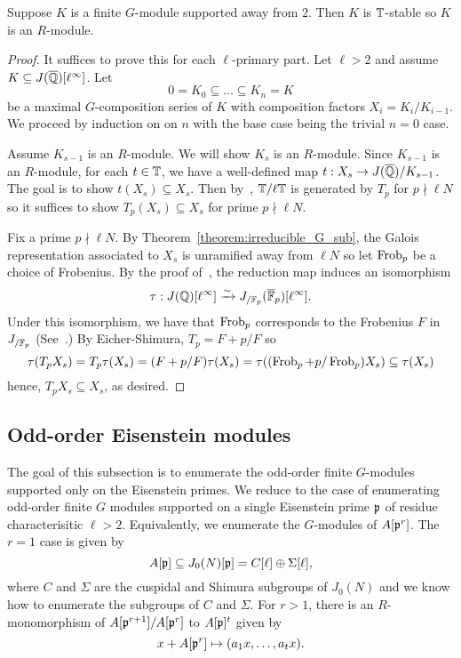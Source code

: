 \documentclass{article}
\begin{document}
\begin{theorem}\label{theorem:G_modules_are_Hecke}
    Suppose $K$ is a finite $G$-module supported away from $2$. Then $K$ is
    $\mathbb{T}$-stable so $K$ is an $R$-module.
\end{theorem}
\begin{proof}
    It suffices to prove this for each $\ell$-primary part. Let $\ell>2$ and
    assume $K\subseteq J(\overline{\mathbb{Q}})[\ell^\infty]$. Let
    \[
        0 = K_0 \subseteq \ldots \subseteq K_n = K
    \]
    be a maximal $G$-composition series of $K$ with composition factors $X_i =
    K_i/K_{i-1}$. We proceed by induction on on $n$ with the base
    case being the trivial $n=0$ case. 
    
    Assume $K_{s-1}$ is an $R$-module. We will show $K_s$ is an $R$-module.
    Since $K_{s-1}$ is an $R$-module, for each $t\in \mathbb{T}$, we have a
    well-defined map $t:X_s\to J(\overline{\mathbb{Q}})/K_{s-1}$. The goal is to show
    $t(X_s)\subseteq X_s$. Then by~\cite[Prop. 6.1]{MR1610883}, $\mathbb{T}/\ell \mathbb{T}$
    is generated by $T_p$ for $p\nmid \ell N$ so it suffices to show
    $T_p(X_s)\subseteq X_s$ for prime $p\nmid \ell N$.

    Fix a prime $p\nmid \ell N$. By Theorem~\ref{theorem:irreducible_G_sub},
    the Galois representation associated to $X_s$ is unramified away from $\ell
    N$ so let $\operatorname{Frob}_p$ be a choice of Frobenius. By the proof of~\cite[Lemma
    12.6.2]{ribet-stein:mod}, the reduction map induces an isomorphism
    \[
        \tau:J(\mathbb{Q})[\ell^\infty] \xrightarrow{\sim} J_{/\mathbb{F}_p} (\overline{\mathbb{F}}_p)[\ell^\infty].
    \]
    Under this isomorphism, we have that $\operatorname{Frob}_p$ corresponds to the Frobenius
    $F$ in $J_{/\mathbb{F}_p}$ (See~\cite[\S 5.3]{ribet-stein:serre}.) By
    Eicher-Shimura, $T_p = F+p/F$ so
    \[
    \tau(T_p X_s) 
    = T_p\tau(X_s) 
    = (F+p/F)\tau(X_s)
    = \tau((\operatorname{Frob}_p+p/\operatorname{Frob}_p)X_s)
    \subseteq \tau(X_s)
    \]
    hence, $T_p X_s\subseteq X_s$, as desired.
\end{proof}

\subsection{Odd-order Eisenstein modules}%
\label{sub:odd_order_eisenstein_modules}

The goal of this subsection is to enumerate the odd-order finite $G$-modules
supported only on the Eisenstein primes. We reduce to the case of
enumerating odd-order finite $G$ modules supported on a single Eisenstein prime
$\mathfrak{p}$ of residue characterisitic $\ell>2$. Equivalently, we enumerate the
$G$-modules of $A[\mathfrak{p}^r]$. The $r=1$ case is given by~\cite[Corollary
16.3]{mazur:eisenstein}
\[
    A[\mathfrak{p}]\subseteq J_0(N)[\mathfrak{p}] = C[\ell] \oplus \Sigma[\ell],
\]
where $C$ and $\Sigma$ are the cuspidal and Shimura subgroups of $J_0(N)$ and
we know how to enumerate the subgroups of $C$ and $\Sigma$. For $r>1$, 
there is an $R$-monomorphism of $A[\mathfrak{p}^{r+1}]/A[\mathfrak{p}^r]$ to $A[\mathfrak{p}]^t$ given by
\[
    x+A[\mathfrak{p}^r]\mapsto (a_1x,\ldots,a_tx).
\]
\end{document}
